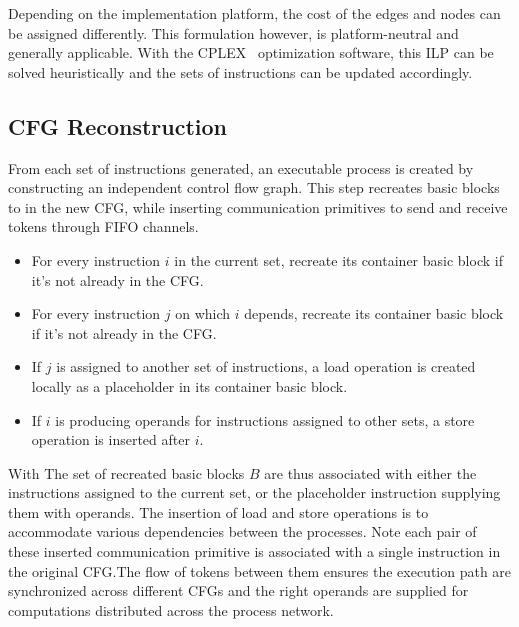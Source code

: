 \documentclass{sig-alternate}
\begin{document}
Depending on the implementation platform, the cost of the edges and nodes can be assigned differently. This formulation however, is platform-neutral and generally applicable.
With the CPLEX~\cite{iILO06a} optimization software, this ILP can be solved heuristically and the sets of instructions can be updated accordingly.


\subsection{CFG Reconstruction}
From each set of instructions generated,
an executable process is created by constructing an independent control flow graph. This step recreates basic blocks to in the new CFG, while inserting communication primitives to send and receive tokens through FIFO channels.
\begin{itemize}
    \item For every instruction $i$  in the current set, recreate
    its container basic block if it's not already in the CFG.
    \item For every instruction $j$ on which $i$ depends, 
    recreate its container basic block if it's not already
    in the CFG.
    \item If $j$ is assigned to another set of instructions, a load operation
    is created locally as a placeholder in its container basic block.
    \item If $i$ is producing operands for instructions assigned to 
    other sets, a store operation is inserted after $i$.
\end{itemize}With 
The set of recreated basic blocks $B$ are thus associated with either the instructions assigned to the current set, or the placeholder instruction supplying them with operands. 
The insertion of load and store operations is to accommodate various
dependencies between the processes. Note each pair of these inserted communication primitive is associated with a single instruction in the original CFG.The flow of
tokens between them ensures the execution path are synchronized across different CFGs
and the right operands are supplied for computations distributed across the
process network. 
\end{document}
